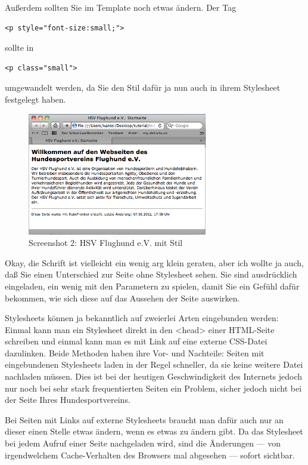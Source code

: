 \documentclass[11pt]{report}
\begin{document}
Außerdem sollten Sie im Template noch etwas ändern. Der Tag


\begin{verbatim}
<p style="font-size:small;">
\end{verbatim}

sollte in


\begin{verbatim}
<p class="small">
\end{verbatim}

umgewandelt werden, da Sie den Stil dafür ja nun auch in ihrem
Stylesheet festgelegt haben.

\begin{figure}[h!]
\centering
\includegraphics[width=0.7\textwidth]{./images/flughund02.png}
\caption{\label{flughund02}Screenshot 2: HSV Flughund e.V. mit Stil}
\end{figure}


Okay, die Schrift ist vielleicht ein wenig arg klein geraten, aber ich
wollte ja auch, daß Sie einen Unterschied zur Seite ohne Stylesheet
sehen. Sie sind ausdrücklich eingeladen, ein wenig mit den Parametern
zu spielen, damit Sie ein Gefühl dafür bekommen, wie sich diese auf
das Aussehen der Seite auswirken.


Stylesheets können ja bekanntlich auf zweierlei Arten eingebunden
werden: Einmal kann man ein Stylesheet direkt in den <head> einer
HTML-Seite schreiben und einmal kann man es mit Link auf eine externe
CSS-Datei dazulinken. Beide Methoden haben ihre Vor- und Nachteile:
Seiten mit eingebundenen Stylesheets laden in der Regel schneller, da
sie keine weitere Datei nachladen müssen. Dies ist bei der heutigen
Geschwindigkeit des Internets jedoch nur noch bei sehr stark
frequentierten Seiten ein Problem, sicher jedoch nicht bei der Seite
Ihres Hundesportvereins.


Bei Seiten mit Links auf externe Stylesheets braucht man dafür auch
nur an dieser einen Stelle etwas ändern, wenn es etwas zu ändern
gibt. Da das Stylesheet bei jedem Aufruf einer Seite nachgeladen wird,
sind die Änderungen — von irgendwelchem Cache-Verhalten des Browsers
mal abgesehen — sofort sichtbar.
\end{document}
